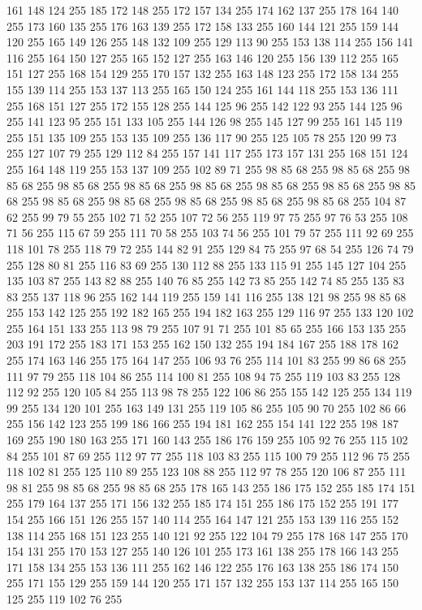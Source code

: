 161 148 124 255 185 172 148 255 172 157 134 255 174 162 137 255 178 164 140 255 173 160 135 255 176 163 139 255 172 158 133 255 160 144 121 255 159 144 120 255 165 149 126 255 148 132 109 255 129 113 90 255 153 138 114 255 156 141 116 255 164 150 127 255 165 152 127 255 163 146 120 255 156 139 112 255 165 151 127 255 168 154 129 255 170 157 132 255 163 148 123 255 172 158 134 255 155 139 114 255 153 137 113 255 165 150 124 255 161 144 118 255 153 136 111 255 168 151 127 255 172 155 128 255 144 125 96 255 142 122 93 255 144 125 96 255 141 123 95 255 151 133 105 255 144 126 98 255 145 127 99 255 161 145 119 255 151 135 109 255 153 135 109 255 136 117 90 255 125 105 78 255 120 99 73 255 127 107 79 255 129 112 84 255 157 141 117 255 173 157 131 255 168 151 124 255 164 148 119 255 153 137 109 255 102 89 71 255 98 85 68 255 98 85 68 255 98 85 68 255 98 85 68 255 98 85 68 255 98 85 68 255 98 85 68 255 98 85 68 255 98 85 68 255 98 85 68 255 98 85 68 255 98 85 68 255
98 85 68 255 98 85 68 255 104 87 62 255 99 79 55 255 102 71 52 255 107 72 56 255 119 97 75 255 97 76 53 255 108 71 56 255 115 67 59 255 111 70 58 255 103 74 56 255 101 79 57 255 111 92 69 255 118 101 78 255 118 79 72 255 144 82 91 255 129 84 75 255 97 68 54 255 126 74 79 255 128 80 81 255 116 83 69 255 130 112 88 255 133 115 91 255 145 127 104 255 135 103 87 255 143 82 88 255 140 76 85 255 142 73 85 255 142 74 85 255 135 83 83 255 137 118 96 255 162 144 119 255 159 141 116 255 138 121 98 255 98 85 68 255 153 142 125 255 192 182 165 255 194 182 163 255 129 116 97 255 133 120 102 255 164 151 133 255 113 98 79 255 107 91 71 255 101 85 65 255 166 153 135 255 203 191 172 255 183 171 153 255 162 150 132 255 194 184 167 255 188 178 162 255 174 163 146 255 175 164 147 255 106 93 76 255 114 101 83 255 99 86 68 255 111 97 79 255 118 104 86 255 114 100 81 255 108 94 75 255 119 103 83 255 128 112 92 255 120 105 84 255 113 98 78 255
122 106 86 255 155 142 125 255 134 119 99 255 134 120 101 255 163 149 131 255 119 105 86 255 105 90 70 255 102 86 66 255 156 142 123 255 199 186 166 255 194 181 162 255 154 141 122 255 198 187 169 255 190 180 163 255 171 160 143 255 186 176 159 255 105 92 76 255 115 102 84 255 101 87 69 255 112 97 77 255 118 103 83 255 115 100 79 255 112 96 75 255 118 102 81 255 125 110 89 255 123 108 88 255 112 97 78 255 120 106 87 255 111 98 81 255 98 85 68 255 98 85 68 255 178 165 143 255 186 175 152 255 185 174 151 255 179 164 137 255 171 156 132 255 185 174 151 255 186 175 152 255 191 177 154 255 166 151 126 255 157 140 114 255 164 147 121 255 153 139 116 255 152 138 114 255 168 151 123 255 140 121 92 255 122 104 79 255 178 168 147 255 170 154 131 255 170 153 127 255 140 126 101 255 173 161 138 255 178 166 143 255 171 158 134 255 153 136 111 255 162 146 122 255 176 163 138 255 186 174 150 255 171 155 129 255 159 144 120 255 171 157 132 255 153 137 114 255 165 150 125 255 119 102 76 255
